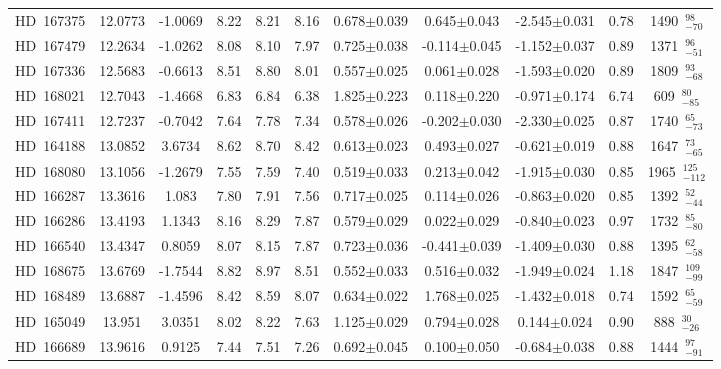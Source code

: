{\begin{longtable}{lcccccccccc}
HD~167375 & 12.0773 & -1.0069 & 8.22 & 8.21 & 8.16 & 0.678$\pm$0.039 & 0.645$\pm$0.043 & -2.545$\pm$0.031 & 0.78 & 1490~$_{-70}^{98}$ \\
\noalign{\smallskip}
HD~167479 & 12.2634 & -1.0262 & 8.08 & 8.10 & 7.97 & 0.725$\pm$0.038 & -0.114$\pm$0.045 & -1.152$\pm$0.037 & 0.89 & 1371~$_{-51}^{96}$ \\
\noalign{\smallskip}
HD~167336 & 12.5683 & -0.6613 & 8.51 & 8.80 & 8.01 & 0.557$\pm$0.025 & 0.061$\pm$0.028 & -1.593$\pm$0.020 & 0.89 & 1809~$_{-68}^{93}$ \\
\noalign{\smallskip}
HD~168021 & 12.7043 & -1.4668 & 6.83 & 6.84 & 6.38 & 1.825$\pm$0.223 & 0.118$\pm$0.220 & -0.971$\pm$0.174 & 6.74 & 609~$_{-85}^{80}$ \\
\noalign{\smallskip}
HD~167411 & 12.7237 & -0.7042 & 7.64 & 7.78 & 7.34 & 0.578$\pm$0.026 & -0.202$\pm$0.030 & -2.330$\pm$0.025 & 0.87 & 1740~$_{-73}^{65}$ \\
\noalign{\smallskip}
HD~164188 & 13.0852 & 3.6734 & 8.62 & 8.70 & 8.42 & 0.613$\pm$0.023 & 0.493$\pm$0.027 & -0.621$\pm$0.019 & 0.88 & 1647~$_{-65}^{73}$ \\
\noalign{\smallskip}
HD~168080 & 13.1056 & -1.2679 & 7.55 & 7.59 & 7.40 & 0.519$\pm$0.033 & 0.213$\pm$0.042 & -1.915$\pm$0.030 & 0.85 & 1965~$_{-112}^{125}$ \\
\noalign{\smallskip}
HD~166287 & 13.3616 & 1.083 & 7.80 & 7.91 & 7.56 & 0.717$\pm$0.025 & 0.114$\pm$0.026 & -0.863$\pm$0.020 & 0.85 & 1392~$_{-44}^{52}$ \\
\noalign{\smallskip}
HD~166286 & 13.4193 & 1.1343 & 8.16 & 8.29 & 7.87 & 0.579$\pm$0.029 & 0.022$\pm$0.029 & -0.840$\pm$0.023 & 0.97 & 1732~$_{-80}^{85}$ \\
\noalign{\smallskip}
HD~166540 & 13.4347 & 0.8059 & 8.07 & 8.15 & 7.87 & 0.723$\pm$0.036 & -0.441$\pm$0.039 & -1.409$\pm$0.030 & 0.88 & 1395~$_{-58}^{62}$ \\
\noalign{\smallskip}
HD~168675 & 13.6769 & -1.7544 & 8.82 & 8.97 & 8.51 & 0.552$\pm$0.033 & 0.516$\pm$0.032 & -1.949$\pm$0.024 & 1.18 & 1847~$_{-99}^{109}$ \\
\noalign{\smallskip}
HD~168489 & 13.6887 & -1.4596 & 8.42 & 8.59 & 8.07 & 0.634$\pm$0.022 & 1.768$\pm$0.025 & -1.432$\pm$0.018 & 0.74 & 1592~$_{-59}^{65}$ \\
\noalign{\smallskip}
HD~165049 & 13.951 & 3.0351 & 8.02 & 8.22 & 7.63 & 1.125$\pm$0.029 & 0.794$\pm$0.028 & 0.144$\pm$0.024 & 0.90 & 888~$_{-26}^{30}$ \\
\noalign{\smallskip}
HD~166689 & 13.9616 & 0.9125 & 7.44 & 7.51 & 7.26 & 0.692$\pm$0.045 & 0.100$\pm$0.050 & -0.684$\pm$0.038 & 0.88 & 1444~$_{-91}^{97}$ \\

\end{longtable}}
